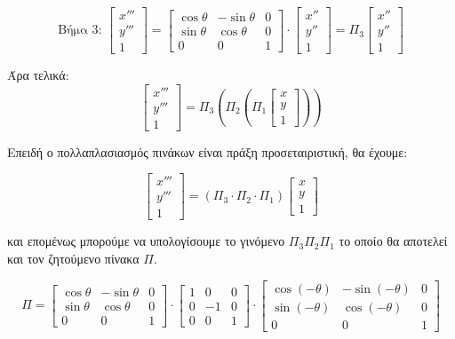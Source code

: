 \[
\text{Βήμα 3: } 
\begin{bmatrix}
x''' \\ y''' \\ 1
\end{bmatrix}
=
\begin{bmatrix}
\cos \theta & -\sin \theta & 0 \\
\sin \theta & \cos \theta & 0 \\
0 & 0 & 1
\end{bmatrix}
\cdot
\begin{bmatrix}
x'' \\ y'' \\ 1
\end{bmatrix}
= \Pi_3
\begin{bmatrix}
x'' \\ y'' \\ 1
\end{bmatrix}
\]

Άρα τελικά:
\[
\begin{bmatrix}
x''' \\ y''' \\ 1
\end{bmatrix}
=
\Pi_3 (\Pi_2 (\Pi_1
\begin{bmatrix}
x \\ y \\ 1
\end{bmatrix}))
\]

Επειδή ο πολλαπλασιασμός πινάκων είναι πράξη προσεταιριστική, θα έχουμε:

\[
\begin{bmatrix}
x''' \\ y''' \\ 1
\end{bmatrix}
=
(\Pi_3 \cdot \Pi_2 \cdot \Pi_1)
\begin{bmatrix}
x \\ y \\ 1
\end{bmatrix}
\]

και επομένως μπορούμε να υπολογίσουμε το γινόμενο $\Pi_3 \Pi_2 \Pi_1$ το οποίο θα αποτελεί και τον ζητούμενο πίνακα $\Pi$.

\[
\Pi =
\begin{bmatrix}
\cos \theta & -\sin \theta & 0 \\
\sin \theta & \cos \theta & 0 \\
0 & 0 & 1
\end{bmatrix}
\cdot
\begin{bmatrix}
1 & 0 & 0 \\
0 & -1 & 0 \\
0 & 0 & 1
\end{bmatrix}
\cdot
\begin{bmatrix}
\cos(-\theta) & -\sin(-\theta) & 0 \\
\sin(-\theta) & \cos(-\theta) & 0 \\
0 & 0 & 1
\end{bmatrix}
\]

